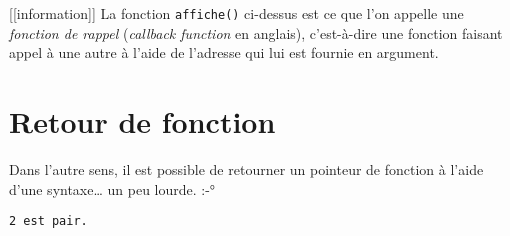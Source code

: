 \documentclass[]{article}
\newenvironment{Shaded}{}{}
\newcommand{\DataTypeTok}[1]{\textcolor[rgb]{0.56,0.13,0.00}{{#1}}}
\newcommand{\DecValTok}[1]{\textcolor[rgb]{0.25,0.63,0.44}{{#1}}}
\newcommand{\SpecialCharTok}[1]{\textcolor[rgb]{0.25,0.44,0.63}{{#1}}}
\newcommand{\StringTok}[1]{\textcolor[rgb]{0.25,0.44,0.63}{{#1}}}
\newcommand{\ImportTok}[1]{{#1}}
\newcommand{\ControlFlowTok}[1]{\textcolor[rgb]{0.00,0.44,0.13}{\textbf{{#1}}}}
\newcommand{\PreprocessorTok}[1]{\textcolor[rgb]{0.74,0.48,0.00}{{#1}}}
\newcommand{\NormalTok}[1]{{#1}}
\begin{document}
{[}{[}information{]}{]} \textbar{} La fonction \texttt{affiche()}
ci-dessus est ce que l'on appelle une \emph{fonction de rappel}
(\emph{callback function} en anglais), c'est-à-dire une fonction faisant
appel à une autre à l'aide de l'adresse qui lui est fournie en argument.

\section{Retour de fonction}\label{retour-de-fonction}

Dans l'autre sens, il est possible de retourner un pointeur de fonction
à l'aide d'une syntaxe\ldots{} un peu lourde. :-°

\begin{Shaded}
\end{Shaded}

\begin{verbatim}
2 est pair.
\end{verbatim}
\end{document}
